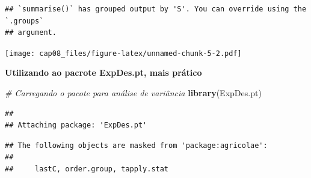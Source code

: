\documentclass[
]{article}
\newenvironment{Shaded}{\begin{snugshade}}{\end{snugshade}}
\newcommand{\AttributeTok}[1]{\textcolor[rgb]{0.13,0.29,0.53}{#1}}
\newcommand{\CommentTok}[1]{\textcolor[rgb]{0.56,0.35,0.01}{\textit{#1}}}
\newcommand{\ConstantTok}[1]{\textcolor[rgb]{0.56,0.35,0.01}{#1}}
\newcommand{\FunctionTok}[1]{\textcolor[rgb]{0.13,0.29,0.53}{\textbf{#1}}}
\newcommand{\NormalTok}[1]{#1}
\newcommand{\OtherTok}[1]{\textcolor[rgb]{0.56,0.35,0.01}{#1}}
\newcommand{\SpecialCharTok}[1]{\textcolor[rgb]{0.81,0.36,0.00}{\textbf{#1}}}
\newcommand{\StringTok}[1]{\textcolor[rgb]{0.31,0.60,0.02}{#1}}
\begin{document}
\begin{verbatim}
## `summarise()` has grouped output by 'S'. You can override using the `.groups`
## argument.
\end{verbatim}

\texttt{[image: cap08\_files/figure-latex/unnamed-chunk-5-2.pdf]}

\textbf{Utilizando ao pacrote ExpDes.pt, mais prático}

\begin{Shaded}
\begin{Highlighting}[]
\CommentTok{\# Carregando o pacote para análise de variância}
\FunctionTok{library}\NormalTok{(ExpDes.pt)}
\end{Highlighting}
\end{Shaded}

\begin{verbatim}
## 
## Attaching package: 'ExpDes.pt'
\end{verbatim}

\begin{verbatim}
## The following objects are masked from 'package:agricolae':
## 
##     lastC, order.group, tapply.stat
\end{verbatim}

\begin{Shaded}
\end{Shaded}
\end{document}
